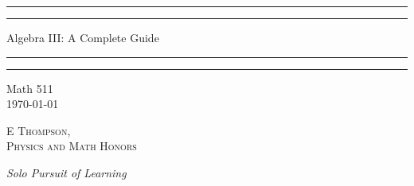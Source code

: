 \documentclass[12pt, a4paper, oneside, openright, titlepage]{book}
\begin{document}

\begin{titlepage}
    \centering
    \scshape
    \vspace*{\baselineskip}
    \rule{\textwidth}{1.6pt}\vspace*{-\baselineskip}\vspace*{2pt}
    \rule{\textwidth}{0.4pt}
    
    \vspace{0.75\baselineskip}
    
    {\LARGE Algebra III: A Complete Guide}
    
    \vspace{0.75\baselineskip}
    
    \rule{\textwidth}{0.4pt}\vspace*{-\baselineskip}\vspace{3.2pt}
    \rule{\textwidth}{1.6pt}
    
    \vspace{2\baselineskip}
    Math 511 \\
    \vspace*{3\baselineskip}
    \monthdayyeardate\today \\
    \vspace*{5.0\baselineskip}
    
    {\scshape\Large E Thompson, \\ Physics and Math Honors\\}
    
    \vspace{1.0\baselineskip}
    \textit{Solo Pursuit of Learning}
    \vfill
    \enlargethispage{1in}
    \begin{figure}[b!]
    \end{figure}
\end{titlepage}
\end{document}
